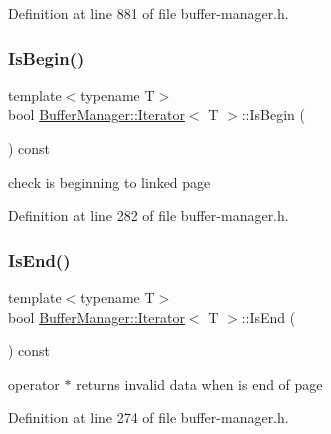 Definition at line 881 of file buffer-\/manager.\+h.

\mbox{\label{class_buffer_manager_1_1_iterator_a7ce4145bd6263f8003c4c4dee01a9c31}} 
\subsubsection{\texorpdfstring{IsBegin()}{IsBegin()}}
{\footnotesize\ttfamily template$<$typename T$>$ \\
bool \mbox{\hyperlink{class_buffer_manager_1_1_iterator}{Buffer\+Manager\+::\+Iterator}}$<$ T $>$\+::Is\+Begin (\begin{DoxyParamCaption}{ }\end{DoxyParamCaption}) const\hspace{0.3cm}{\ttfamily [inline]}}

check is beginning to linked page 

Definition at line 282 of file buffer-\/manager.\+h.

\mbox{\label{class_buffer_manager_1_1_iterator_a02a38a84fd54e45d06818d2807b172d8}} 
\subsubsection{\texorpdfstring{IsEnd()}{IsEnd()}}
{\footnotesize\ttfamily template$<$typename T$>$ \\
bool \mbox{\hyperlink{class_buffer_manager_1_1_iterator}{Buffer\+Manager\+::\+Iterator}}$<$ T $>$\+::Is\+End (\begin{DoxyParamCaption}{ }\end{DoxyParamCaption}) const\hspace{0.3cm}{\ttfamily [inline]}}

{\ttfamily operator $\ast$} returns invalid data when is end of page 

Definition at line 274 of file buffer-\/manager.\+h.

\mbox{\label{class_buffer_manager_1_1_iterator_a6afaceac9683f05d9e1ecfc9ff5f3a0f}} 
